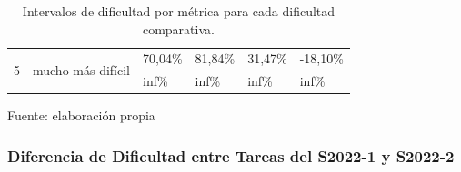 \documentclass[letterpaper,12pt]{article}
\begin{document}
\begin{table}[H]
\begin{tabular}{|l|r|r|r|r|}
    \multirow{2}{*}{5 - mucho más difícil} & 70,04\%                                               & 81,84\%                                     & 31,47\%                                & -18,10\%                              \\ \cline{2-5}
                                           & \multicolumn{1}{l|}{inf\%}                            & \multicolumn{1}{l|}{inf\%}                  & \multicolumn{1}{l|}{inf\%}             & \multicolumn{1}{l|}{inf\%}            \\ \hline
  \end{tabular}
  \caption{Intervalos de dificultad por métrica para cada dificultad comparativa.} Fuente: elaboración propia
  \label{tab:compDif}
\end{table}

\subsubsection{Diferencia de Dificultad entre Tareas del S2022-1 y S2022-2}
\end{document}
